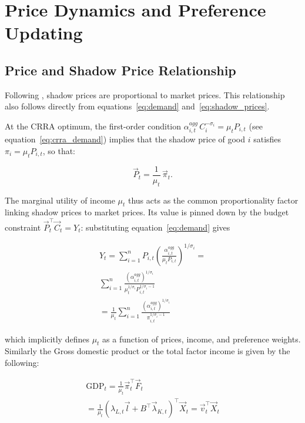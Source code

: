 \section{Price Dynamics and Preference Updating}
\label{sec:dynamics}

\subsection{Price and Shadow Price Relationship}

Following \citet{lange1936economic}, shadow prices are proportional to
market prices.
This relationship also follows directly from
equations~\eqref{eq:demand} and~\eqref{eq:shadow_prices}.

At the CRRA optimum, the first-order condition
$\alpha^{agg}_{i,t}\,C_i^{-\sigma_i} = \mu_t P_{i,t}$
(see equation~\eqref{eq:crra_demand}) implies that the shadow price of
good $i$ satisfies $\pi_i = \mu_t P_{i,t}$, so that:
   
\begin{equation}\label{eq:price_proportional}
    \vec{P}_t = \frac{1}{\mu_t}\,\vec{\pi}_t.
\end{equation}
 
The marginal utility of income $\mu_t$ thus acts as the common
proportionality factor linking shadow prices to market prices. Its
value is pinned down by the budget constraint
$\vec{P}_t^\top \vec{C}_t = Y_t$: substituting
equation~\eqref{eq:demand} gives

\begin{multline}\label{eq:mu_determination}
    Y_t = \sum_{i=1}^n P_{i,t}
          \left(\frac{\alpha^{agg}_{i,t}}{\mu_t P_{i,t}}\right)^{1/\sigma_i}
        = \\ \sum_{i=1}^n \frac{(\alpha^{agg}_{i,t})^{1/\sigma_i}}{\mu_t^{1/\sigma_{i}}P_{i,t}^{1/\sigma_i - 1}} \\ =
       \frac{1}{\mu_t} \sum_{i=1}^n \frac{(\alpha^{agg}_{i,t})^{1/\sigma_i}}{\pi_{i,t}^{1/\sigma_i - 1}}
\end{multline}

which implicitly defines $\mu_t$ as a function of prices, income, and
preference weights. Similarly the Gross domestic product or the total factor income is given by the following:

\begin{multline}
    \text{GDP}_{t} = \frac{1}{\mu_{t}} \vec{\pi}_{t}^{\top} \vec{F}_{t} \\ =
    \frac{1}{\mu_{t}}\left(\lambda_{L,t}\vec{l} + B^{\top} \vec{\lambda}_{K,t} \right)^{\top} \vec{X}_{t} = \vec{v}_{t}^{\top} \vec{X}_{t}
\end{multline}

